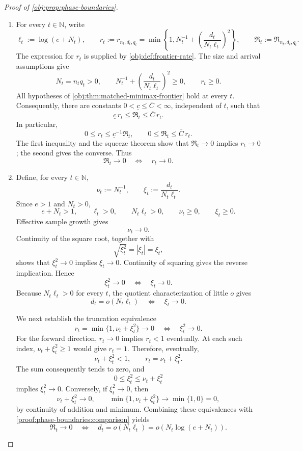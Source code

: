 \begin{proof}[Proof of \cref{obj:prop:phase-boundaries}]
\begin{enumerate}
\item\label{proof:phase-boundaries:comparison} For every \(t\in\mathbb N\), write
\[
\ell_t:=\log(e+N_t),\qquad
r_t:=r_{n_t,d_t,q_t}
=\min\left\{1,N_t^{-1}
+\left(\frac{d_t}{N_t\ell_t}\right)^2\right\},
\qquad
\mathfrak R_t:=\mathfrak R_{n_t,d_t,q_t}.
\]
The expression for \(r_t\) is supplied by \cref{obj:def:frontier-rate}. The size and arrival assumptions give
\[
N_t=n_tq_t>0,\qquad
N_t^{-1}+\left(\frac{d_t}{N_t\ell_t}\right)^2\ge0,
\qquad r_t\ge0.
\]
All hypotheses of \cref{obj:thm:matched-minimax-frontier} hold at every \(t\). Consequently, there are constants
\(0<\underline c\le\overline C<\infty\), independent of \(t\), such that
\[
\underline c\,r_t\le\mathfrak R_t\le\overline C\,r_t.
\]
In particular,
\[
0\le r_t\le\underline c^{-1}\mathfrak R_t,
\qquad
0\le\mathfrak R_t\le\overline C\,r_t.
\]
The first inequality and the squeeze theorem show that
\(\mathfrak R_t\to0\) implies \(r_t\to0\); the second gives the converse. Thus
\[
\mathfrak R_t\longrightarrow0
\quad\Longleftrightarrow\quad
r_t\longrightarrow0.
\]

\item\label{proof:phase-boundaries:convergence} Define, for every \(t\in\mathbb N\),
\[
\nu_t:=N_t^{-1},
\qquad
\xi_t:=\frac{d_t}{N_t\ell_t}.
\]
Since \(e>1\) and \(N_t>0\),
\[
e+N_t>1,\qquad
\ell_t>0,\qquad
N_t\ell_t>0,\qquad
\nu_t\ge0,\qquad \xi_t\ge0.
\]
Effective sample growth gives
\[
\nu_t\longrightarrow0.
\]
Continuity of the square root, together with
\[
\sqrt{\xi_t^2}=|\xi_t|=\xi_t,
\]
shows that \(\xi_t^2\to0\) implies \(\xi_t\to0\). Continuity of squaring gives the reverse implication. Hence
\[
\xi_t^2\longrightarrow0
\quad\Longleftrightarrow\quad
\xi_t\longrightarrow0.
\]
Because \(N_t\ell_t>0\) for every \(t\), the quotient characterization of little \(o\) gives
\[
d_t=o(N_t\ell_t)
\quad\Longleftrightarrow\quad
\xi_t\longrightarrow0.
\]

We next establish the truncation equivalence
\[
r_t=\min\{1,\nu_t+\xi_t^2\}\longrightarrow0
\quad\Longleftrightarrow\quad
\xi_t^2\longrightarrow0.
\]
For the forward direction, \(r_t\to0\) implies \(r_t<1\) eventually. At each such index, \(\nu_t+\xi_t^2\ge1\) would give \(r_t=1\). Therefore, eventually,
\[
\nu_t+\xi_t^2<1,\qquad
r_t=\nu_t+\xi_t^2.
\]
The sum consequently tends to zero, and
\[
0\le\xi_t^2\le\nu_t+\xi_t^2
\]
implies \(\xi_t^2\to0\). Conversely, if \(\xi_t^2\to0\), then
\[
\nu_t+\xi_t^2\longrightarrow0,
\qquad
\min\{1,\nu_t+\xi_t^2\}\longrightarrow\min\{1,0\}=0,
\]
by continuity of addition and minimum. Combining these equivalences with \cref{proof:phase-boundaries:comparison} yields
\[
\mathfrak R_t\longrightarrow0
\quad\Longleftrightarrow\quad
d_t=o(N_t\ell_t)
=o\!\left(N_t\log(e+N_t)\right).
\]


\end{enumerate}
\end{proof}
